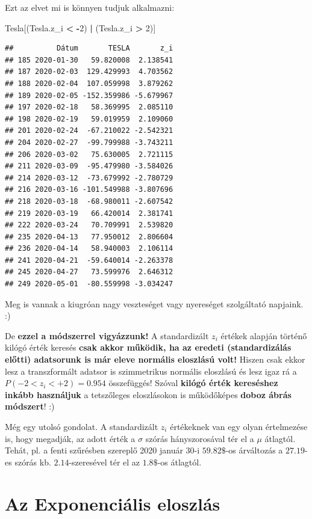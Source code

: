 \documentclass[
]{book}
\newenvironment{Shaded}{\begin{snugshade}}{\end{snugshade}}
\newcommand{\DecValTok}[1]{\textcolor[rgb]{0.00,0.00,0.81}{#1}}
\newcommand{\NormalTok}[1]{#1}
\newcommand{\OperatorTok}[1]{\textcolor[rgb]{0.81,0.36,0.00}{\textbf{#1}}}
\begin{document}
Ezt az elvet mi is könnyen tudjuk alkalmazni:

\begin{Shaded}
\begin{Highlighting}[]
\NormalTok{Tesla[(Tesla.z\_i }\OperatorTok{\textless{}} \OperatorTok{{-}}\DecValTok{2}\NormalTok{) }\OperatorTok{|}\NormalTok{ (Tesla.z\_i }\OperatorTok{\textgreater{}} \DecValTok{2}\NormalTok{)]}
\end{Highlighting}
\end{Shaded}

\begin{verbatim}
##          Dátum       TESLA       z_i
## 185 2020-01-30   59.820008  2.138541
## 187 2020-02-03  129.429993  4.703562
## 188 2020-02-04  107.059998  3.879262
## 189 2020-02-05 -152.359986 -5.679967
## 197 2020-02-18   58.369995  2.085110
## 198 2020-02-19   59.019959  2.109060
## 201 2020-02-24  -67.210022 -2.542321
## 204 2020-02-27  -99.799988 -3.743211
## 206 2020-03-02   75.630005  2.721115
## 211 2020-03-09  -95.479980 -3.584026
## 214 2020-03-12  -73.679992 -2.780729
## 216 2020-03-16 -101.549988 -3.807696
## 218 2020-03-18  -68.980011 -2.607542
## 219 2020-03-19   66.420014  2.381741
## 222 2020-03-24   70.709991  2.539820
## 235 2020-04-13   77.950012  2.806604
## 236 2020-04-14   58.940003  2.106114
## 241 2020-04-21  -59.640014 -2.263378
## 245 2020-04-27   73.599976  2.646312
## 249 2020-05-01  -80.559998 -3.034247
\end{verbatim}

Meg is vannak a kiugróan nagy veszteséget vagy nyereséget szolgáltató napjaink. :)

De \textbf{ezzel a módszerrel vigyázzunk!} A standardizált \(z_i\) értékek alapján történő kilógó érték keresés \textbf{csak akkor működik, ha az eredeti (standardizálás előtti) adatsorunk is már eleve normális eloszlású volt!} Hiszen csak ekkor lesz a transzformált adatsor is szimmetrikus normális eloszlású és lesz igaz rá a \(P(-2 < z_i < +2)=0.954\) összefüggés!
Szóval \textbf{kilógó érték kereséshez inkább használjuk} a tetszőleges eloszlásokon is működőképes \textbf{doboz ábrás módszert}! :)

Még egy utolsó gondolat. A standardizált \(z_i\) értékeknek van egy olyan értelmezése is, hogy megadják, az adott érték a \(\sigma\) szórás hányszorosával tér el a \(\mu\) átlagtól.
Tehát, pl. a fenti szűrésben szereplő 2020 január 30-i \(59.82\$\)-os árváltozás a \(27.19\)-es szórás kb. \(2.14\)-szeresével tér el az \(1.8\$\)-os átlagtól.

\section{Az Exponenciális eloszlás}\label{az-exponenciuxe1lis-eloszluxe1s}
\end{document}
